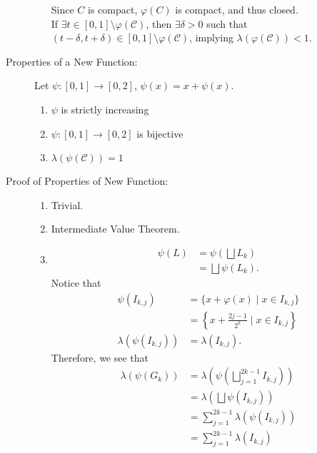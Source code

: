 \documentclass[9pt]{extarticle}
\begin{document}
\begin{description}
\begin{enumerate}[(1)]
          Since $C$ is compact, $\varphi(C)$ is compact, and thus closed.\\

          If $\exists t\in [0,1]\setminus \varphi(\mathcal{C})$, then $\exists \delta > 0$ such that $(t-\delta,t+\delta)\in [0,1]\setminus \varphi(\mathcal{C})$, implying $\lambda(\varphi(\mathcal{C})) < 1$.
      \end{enumerate}
    \item[Properties of a New Function:] Let $\psi: [0,1]\rightarrow [0,2]$, $\psi(x) = x + \psi(x)$.
      \begin{enumerate}[(1)]
        \item $\psi$ is strictly increasing
        \item $\psi: [0,1]\rightarrow [0,2]$ is bijective
        \item $\lambda(\psi(\mathcal{C})) = 1$
      \end{enumerate}
    \item[Proof of Properties of New Function:]\hfill
      \begin{enumerate}[(1)]
        \item Trivial.
        \item Intermediate Value Theorem.
        \item 
          \begin{align*}
            \psi(L) &= \psi\left(\bigsqcup L_k\right)\\
                    &= \bigsqcup \psi(L_k).
          \end{align*}
          Notice that
          \begin{align*}
            \psi(I_{k,j}) &= \{x + \varphi(x)\mid x\in I_{k,j}\}\\
                          &= \left\{x + \frac{2j-1}{2^{k}}\mid x\in I_{k,j}\right\}\\
            \lambda(\psi(I_{k,j})) &= \lambda(I_{k,j}).
          \end{align*}
          Therefore, we see that
          \begin{align*}
            \lambda(\psi(G_k)) &= \lambda\left(\psi\left(\bigsqcup_{j=1}^{2k-1}I_{k,j}\right)\right)\\
                               &= \lambda\left(\bigsqcup\psi(I_{k,j})\right)\\
                               &= \sum_{j=1}^{2k-1} \lambda(\psi(I_{k,j}))\\
                               &= \sum_{j=1}^{2k-1}\lambda(I_{k,j})\\

\end{align*}
\end{enumerate}
\end{description}
\end{document}
